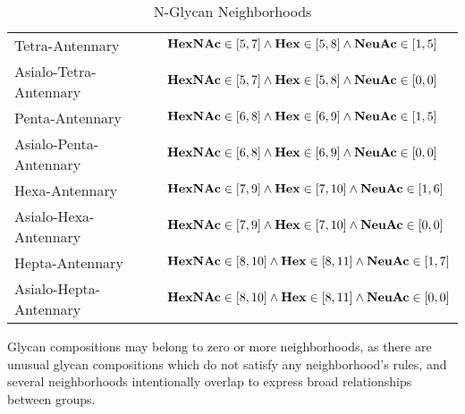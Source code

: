 \begin{table}[tb]
\begin{tabular}[h]{l p{8cm}}
                Tetra-Antennary & $
                    {\bf HexNAc} \in [5, 7]
                    \land {\bf Hex} \in [5, 8]
                    \land {\bf NeuAc} \in [1, 5]
                $\\
                Asialo-Tetra-Antennary & $
                    {\bf HexNAc} \in [5, 7]
                    \land {\bf Hex} \in [5, 8]
                    \land {\bf NeuAc} \in [0, 0]
                $\\
                Penta-Antennary & $
                    {\bf HexNAc} \in [6, 8]
                    \land {\bf Hex} \in [6, 9]
                    \land {\bf NeuAc} \in [1, 5]
                $\\
                Asialo-Penta-Antennary & $
                    {\bf HexNAc} \in [6, 8]
                    \land {\bf Hex} \in [6, 9]
                    \land {\bf NeuAc} \in [0, 0]
                $\\
                Hexa-Antennary & $
                    {\bf HexNAc} \in [7, 9]
                    \land {\bf Hex} \in [7, 10]
                    \land {\bf NeuAc} \in [1, 6]
                $\\
                Asialo-Hexa-Antennary & $
                    {\bf HexNAc} \in [7, 9]
                    \land {\bf Hex} \in [7, 10]
                    \land {\bf NeuAc} \in [0, 0]
                $\\
                Hepta-Antennary & $
                    {\bf HexNAc} \in [8, 10]
                    \land {\bf Hex} \in [8, 11]
                    \land {\bf NeuAc} \in [1, 7]
                $\\
                Asialo-Hepta-Antennary & $
                    {\bf HexNAc} \in [8, 10]
                    \land {\bf Hex} \in [8, 11]
                    \land {\bf NeuAc} \in [0, 0]
                $
            \end{tabular}
            \caption{N-Glycan Neighborhoods}
            \label{tab:neighborhood_definitions}
        \end{table}

        Glycan compositions may belong to zero or more neighborhoods,
        as there are unusual glycan compositions which do not satisfy
        any neighborhood's rules, and several neighborhoods intentionally
        overlap to express broad relationships between groups.

